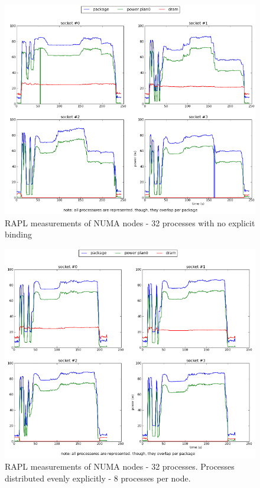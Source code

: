 \begin{figure}[h!]
  \centering
    \includegraphics[width=150mm]{"img/numa/32proc"}
    \caption{RAPL measurements of NUMA nodes - 32 processes with no explicit
    \label{fig:nf_ss}
binding}
\end{figure}

\begin{figure}[h!]
  \centering
    \includegraphics[width=150mm]{"img/numa/32proc_explicitly_distributed"}
    \caption{RAPL measurements of NUMA nodes - 32 processes. Processes
distributed evenly explicitly - 8 processes per node. }
    \label{fig:nf_ss}
\end{figure}



